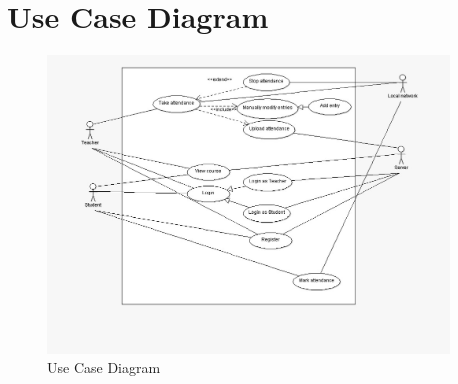 \documentclass{article}
\begin{document}
\section{Use Case Diagram}
\begin{figure}[H]
    \centering
    \includegraphics[width=0.95\textwidth]{UseCase.jpeg}
    \caption{Use Case Diagram}
    \label{fig:UseCase}
\end{figure}
\end{document}

